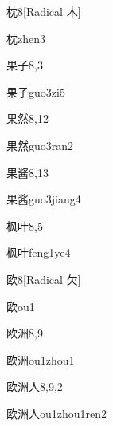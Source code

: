 \begin{entry}{枕}{8}[Radical 木]
  \begin{phonetics}{枕}{zhen3}
  \end{phonetics}
\end{entry}

\begin{entry}{果子}{8,3}
  \begin{phonetics}{果子}{guo3zi5}
  \end{phonetics}
\end{entry}

\begin{entry}{果然}{8,12}
  \begin{phonetics}{果然}{guo3ran2}
  \end{phonetics}
\end{entry}

\begin{entry}{果酱}{8,13}
  \begin{phonetics}{果酱}{guo3jiang4}
  \end{phonetics}
\end{entry}

\begin{entry}{枫叶}{8,5}
  \begin{phonetics}{枫叶}{feng1ye4}
  \end{phonetics}
\end{entry}

\begin{entry}{欧}{8}[Radical 欠]
  \begin{phonetics}{欧}{ou1}
  \end{phonetics}
\end{entry}

\begin{entry}{欧洲}{8,9}
  \begin{phonetics}{欧洲}{ou1zhou1}
  \end{phonetics}
\end{entry}

\begin{entry}{欧洲人}{8,9,2}
  \begin{phonetics}{欧洲人}{ou1zhou1ren2}
  \end{phonetics}
\end{entry}

